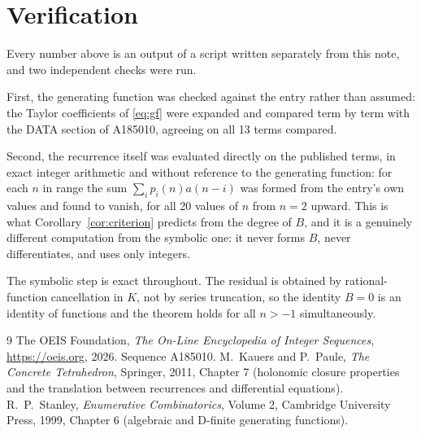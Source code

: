 \documentclass[11pt,a4paper]{article}
\theoremstyle{plain}
\theoremstyle{definition}
\begin{document}
\section{Verification}

Every number above is an output of a script written separately from this note, and two
independent checks were run.

First, the generating function was checked against the entry rather than assumed: the
Taylor coefficients of \eqref{eq:gf} were expanded and compared term by term with the DATA
section of A185010, agreeing on all 13 terms compared.

Second, the recurrence itself was evaluated directly on the published terms, in exact
integer arithmetic and without reference to the generating function: for each $n$ in range
the sum $\sum_{i}p_{i}(n)a(n-i)$ was formed from the entry's own values and found to
vanish, for all 20 values of $n$ from $n=2$ upward. This is what
Corollary~\ref{cor:criterion} predicts from the degree of $B$, and it is a genuinely
different computation from the symbolic one: it never forms $B$, never differentiates, and
uses only integers.

The symbolic step is exact throughout. The residual is obtained by rational-function
cancellation in $K$, not by series truncation, so the identity $B=0$ is an
identity of functions and the theorem holds for all $n>-1$ simultaneously.

\begin{thebibliography}{9}
 The OEIS Foundation, \emph{The On-Line Encyclopedia of Integer Sequences},
\url{https://oeis.org}, 2026. Sequence A185010.
 M.~Kauers and P.~Paule, \emph{The Concrete Tetrahedron}, Springer, 2011,
Chapter 7 (holonomic closure properties and the translation between recurrences and
differential equations).
 R.~P.~Stanley, \emph{Enumerative Combinatorics}, Volume 2, Cambridge
University Press, 1999, Chapter 6 (algebraic and D-finite generating functions).
\end{thebibliography}
\end{document}
